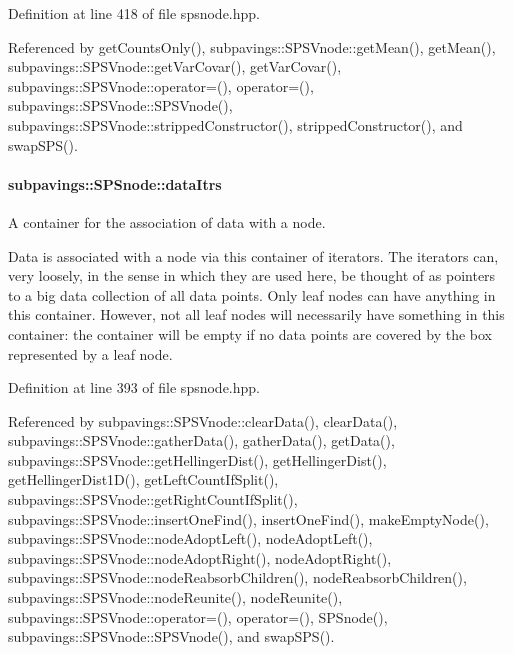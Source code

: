 \-Definition at line 418 of file spsnode.\-hpp.



\-Referenced by get\-Counts\-Only(), subpavings\-::\-S\-P\-S\-Vnode\-::get\-Mean(), get\-Mean(), subpavings\-::\-S\-P\-S\-Vnode\-::get\-Var\-Covar(), get\-Var\-Covar(), subpavings\-::\-S\-P\-S\-Vnode\-::operator=(), operator=(), subpavings\-::\-S\-P\-S\-Vnode\-::\-S\-P\-S\-Vnode(), subpavings\-::\-S\-P\-S\-Vnode\-::stripped\-Constructor(), stripped\-Constructor(), and swap\-S\-P\-S().

\hypertarget{classsubpavings_1_1SPSnode_a2d45b1e3b34a39d128143a0829f051f8}{
\paragraph[{data\-Itrs}]{ {\bf subpavings\-::\-S\-P\-Snode\-::data\-Itrs}}}\label{classsubpavings_1_1SPSnode_a2d45b1e3b34a39d128143a0829f051f8}


\-A container for the association of data with a node. 

\-Data is associated with a node via this container of iterators. \-The iterators can, very loosely, in the sense in which they are used here, be thought of as pointers to a big data collection of all data points. \-Only leaf nodes can have anything in this container. \-However, not all leaf nodes will necessarily have something in this container\-: the container will be empty if no data points are covered by the box represented by a leaf node. 

\-Definition at line 393 of file spsnode.\-hpp.



\-Referenced by subpavings\-::\-S\-P\-S\-Vnode\-::clear\-Data(), clear\-Data(), subpavings\-::\-S\-P\-S\-Vnode\-::gather\-Data(), gather\-Data(), get\-Data(), subpavings\-::\-S\-P\-S\-Vnode\-::get\-Hellinger\-Dist(), get\-Hellinger\-Dist(), get\-Hellinger\-Dist1\-D(), get\-Left\-Count\-If\-Split(), subpavings\-::\-S\-P\-S\-Vnode\-::get\-Right\-Count\-If\-Split(), subpavings\-::\-S\-P\-S\-Vnode\-::insert\-One\-Find(), insert\-One\-Find(), make\-Empty\-Node(), subpavings\-::\-S\-P\-S\-Vnode\-::node\-Adopt\-Left(), node\-Adopt\-Left(), subpavings\-::\-S\-P\-S\-Vnode\-::node\-Adopt\-Right(), node\-Adopt\-Right(), subpavings\-::\-S\-P\-S\-Vnode\-::node\-Reabsorb\-Children(), node\-Reabsorb\-Children(), subpavings\-::\-S\-P\-S\-Vnode\-::node\-Reunite(), node\-Reunite(), subpavings\-::\-S\-P\-S\-Vnode\-::operator=(), operator=(), \-S\-P\-Snode(), subpavings\-::\-S\-P\-S\-Vnode\-::\-S\-P\-S\-Vnode(), and swap\-S\-P\-S().

